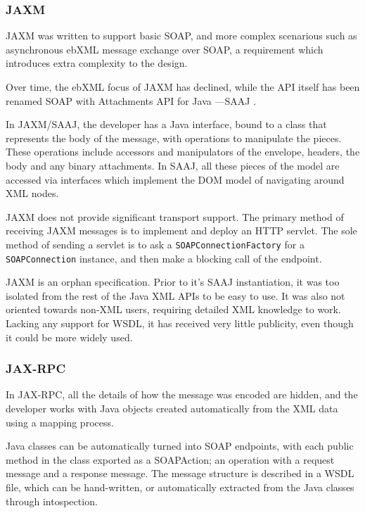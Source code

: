\subsubsection{JAXM}

JAXM was written to support basic SOAP, and more complex scenarious
such as asynchronous ebXML message exchange over SOAP, a requirement
which introduces extra complexity to the design. 

Over time, the ebXML focus of JAXM has declined, while the API itself
has been renamed  SOAP with Attachments API for Java ---SAAJ \cite{spec:SAAJ-12}. 

In JAXM/SAAJ, the developer has a Java interface, bound to a 
class that represents the body of the message, with operations to
manipulate the pieces. These operations include accessors and
manipulators of the envelope, headers, the body and any binary attachments. In
SAAJ, all these pieces of the model are accessed via interfaces which
implement the DOM \cite{DOM} model of navigating around XML nodes.

JAXM does not provide significant transport support. The primary method
of receiving JAXM messages is to implement and deploy an HTTP servlet.
The sole method of sending a servlet is to ask a
\verb|SOAPConnectionFactory| for a \verb|SOAPConnection| instance, and
then make a blocking call of the endpoint.

JAXM is an orphan specification. Prior to it's SAAJ instantiation, it
was too isolated from the rest of the Java XML APIs to be easy to use.
It was also not oriented towards non-XML users, requiring detailed XML
knowledge to work. Lacking any support for WSDL, it has received very
little publicity, even though it could be more widely used.  

\subsubsection{JAX-RPC}

In JAX-RPC, all the details of how the message was
encoded are hidden, and the developer works with Java objects created
automatically from the XML data using a mapping process.

Java classes can be automatically turned into SOAP endpoints, with each
public method in the class exported as a SOAPAction; an operation with a
request message and a response message. The message structure is
described in a WSDL file, which can be hand-written, or automatically
extracted from the Java classes through intospection.


